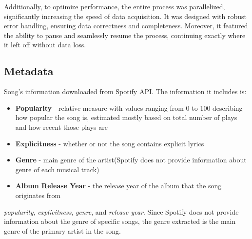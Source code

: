 Additionally, to optimize performance, the entire process was parallelized,
significantly increasing the speed of data acquisition. It was designed with
robust error handling, ensuring data correctness and completeness. Moreover, it
featured the ability to pause and seamlessly resume the process, continuing
exactly where it left off without data loss.




\subsection{Metadata}
\label{sec:metadata}
Song's information downloaded from Spotify API. The information it includes is:

\begin{itemize}
  \item \textbf{Popularity} - relative measure with values ranging from 0 to
    100 describing how popular the song is, estimated mostly based on total
    number of plays and how recent  those plays are
  \item \textbf{Explicitness} - whether or not the song contains explicit lyrics
  \item \textbf{Genre} - main genre of the artist(Spotify does not provide
    information about genre of each musical track)
  \item \textbf{Album Release Year} - the release year of the album that the
    song originates from
\end{itemize}

\textit{popularity}, \textit{explicitness},
\textit{genre}, and \textit{release year}. Since Spotify does not provide
information about the genre of specific songs, the genre extracted is the main
genre of the primary artist in the song.


